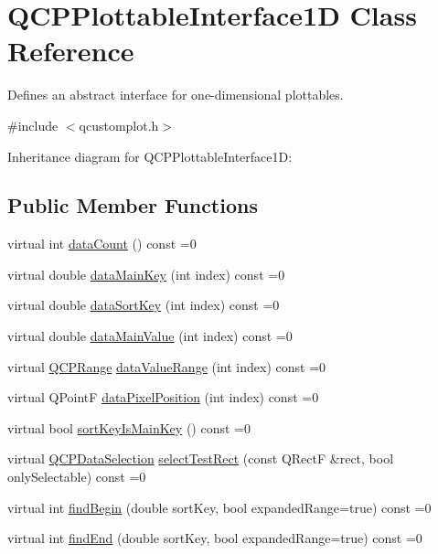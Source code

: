 \hypertarget{classQCPPlottableInterface1D}{}\section{Q\+C\+P\+Plottable\+Interface1D Class Reference}
\label{classQCPPlottableInterface1D}


Defines an abstract interface for one-\/dimensional plottables.  




{\ttfamily \#include $<$qcustomplot.\+h$>$}



Inheritance diagram for Q\+C\+P\+Plottable\+Interface1D\+:
\subsection*{Public Member Functions}
\begin{DoxyCompactItemize}
\item 
virtual int \hyperlink{classQCPPlottableInterface1D_a058a22c770ef4d5a0e878a7f02183da9}{data\+Count} () const =0
\item 
virtual double \hyperlink{classQCPPlottableInterface1D_a2bd60daaac046945fead558cbd83cf73}{data\+Main\+Key} (int index) const =0
\item 
virtual double \hyperlink{classQCPPlottableInterface1D_afdc92f9f01e7e35f2e96b2ea9dc14ae7}{data\+Sort\+Key} (int index) const =0
\item 
virtual double \hyperlink{classQCPPlottableInterface1D_af6330919e8023277d08c958a6074fc76}{data\+Main\+Value} (int index) const =0
\item 
virtual \hyperlink{classQCPRange}{Q\+C\+P\+Range} \hyperlink{classQCPPlottableInterface1D_a9ca7fcf14d885a200879768679b19be9}{data\+Value\+Range} (int index) const =0
\item 
virtual Q\+PointF \hyperlink{classQCPPlottableInterface1D_a78911838cfbcfd2d8df9ad2fdbfb8e93}{data\+Pixel\+Position} (int index) const =0
\item 
virtual bool \hyperlink{classQCPPlottableInterface1D_a229e65e7ab968dd6cd0e259fa504b79d}{sort\+Key\+Is\+Main\+Key} () const =0
\item 
virtual \hyperlink{classQCPDataSelection}{Q\+C\+P\+Data\+Selection} \hyperlink{classQCPPlottableInterface1D_a67093e4ccf490ff5f7750640941ff34c}{select\+Test\+Rect} (const Q\+RectF \&rect, bool only\+Selectable) const =0
\item 
virtual int \hyperlink{classQCPPlottableInterface1D_a5b95783271306a4de97be54eac1e7d13}{find\+Begin} (double sort\+Key, bool expanded\+Range=true) const =0
\item 
virtual int \hyperlink{classQCPPlottableInterface1D_a5deced1016bc55a41a2339619045b295}{find\+End} (double sort\+Key, bool expanded\+Range=true) const =0
\end{DoxyCompactItemize}


